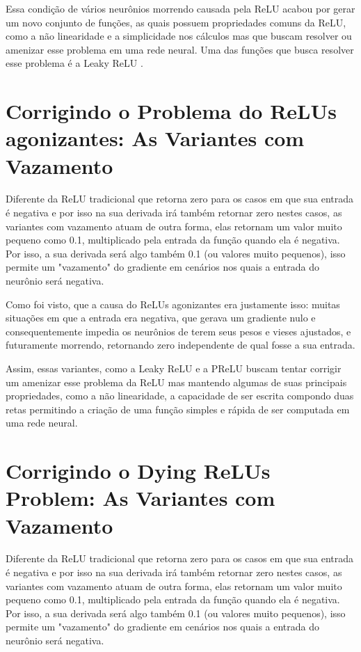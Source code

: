 Essa condição de vários neurônios morrendo causada pela ReLU acabou por gerar um novo conjunto de funções, as quais possuem propriedades comuns da ReLU, como a não linearidade e a simplicidade nos cálculos mas que buscam resolver ou amenizar esse problema em uma rede neural. Uma das funções que busca resolver esse problema é a Leaky ReLU \parencite{DyingReluDouglas}.

\section{Corrigindo o Problema do ReLUs agonizantes: As Variantes com Vazamento}

Diferente da ReLU tradicional que retorna zero para os casos em que sua entrada é negativa e por isso na sua derivada irá também retornar zero nestes casos, as variantes com vazamento atuam de outra forma, elas retornam um valor muito pequeno como 0.1, multiplicado pela entrada da função quando ela é negativa. Por isso, a sua derivada será algo também 0.1 (ou valores muito pequenos), isso permite um "vazamento" do gradiente em cenários nos quais a entrada do neurônio será negativa.

Como foi visto, que a causa do ReLUs agonizantes era justamente isso: muitas situações em que a entrada era negativa, que gerava um gradiente nulo e consequentemente impedia os neurônios de terem seus pesos e vieses ajustados, e futuramente morrendo, retornando zero independente de qual fosse a sua entrada.

Assim, essas variantes, como a Leaky ReLU e a PReLU buscam tentar corrigir um amenizar esse problema da ReLU mas mantendo algumas de suas principais propriedades, como a não linearidade, a capacidade de ser escrita compondo duas retas permitindo a criação de uma função simples e rápida de ser computada em uma rede neural.

\section{Corrigindo o Dying ReLUs Problem: As Variantes com Vazamento}

Diferente da ReLU tradicional que retorna zero para os casos em que sua entrada é negativa e por isso na sua derivada irá também retornar zero nestes casos, as variantes com vazamento atuam de outra forma, elas retornam um valor muito pequeno como 0.1, multiplicado pela entrada da função quando ela é negativa. Por isso, a sua derivada será algo também 0.1 (ou valores muito pequenos), isso permite um "vazamento" do gradiente em cenários nos quais a entrada do neurônio será negativa.

